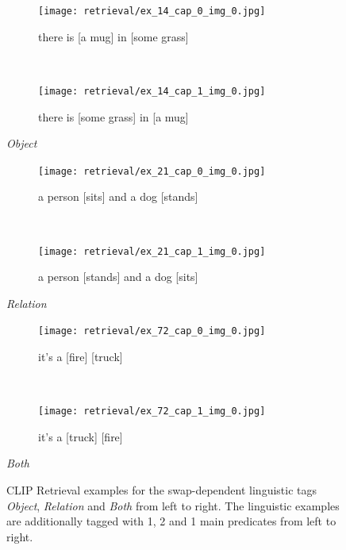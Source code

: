 \begin{figure}[ht]
\centering
    \begin{minipage}[t]{.30\textwidth}
        \begin{subfigure}[t]{\textwidth}
        \centering
        \texttt{[image: retrieval/ex\_14\_cap\_0\_img\_0.jpg]}
        \caption{there is [a mug] in [some grass]}
        \end{subfigure}\\
        \begin{subfigure}[t]{\textwidth}
        \centering
        \texttt{[image: retrieval/ex\_14\_cap\_1\_img\_0.jpg]}
        \caption{there is [some grass] in [a mug]}
        \end{subfigure}%
        \caption*{\textit{Object}}
    \end{minipage}
    \hfill
    \begin{minipage}[t]{.30\textwidth}
        \begin{subfigure}[t]{\textwidth}
        \centering
        \texttt{[image: retrieval/ex\_21\_cap\_0\_img\_0.jpg]}
        \caption{a person [sits] and a dog [stands]}
        \end{subfigure}\\
        \begin{subfigure}[t]{\textwidth}
        \centering
        \texttt{[image: retrieval/ex\_21\_cap\_1\_img\_0.jpg]}
        \caption{a person [stands] and a dog [sits]}
        \end{subfigure}%
        \caption*{\textit{Relation}}
    \end{minipage}
    \hfill
    \begin{minipage}[t]{.30\textwidth}
        \begin{subfigure}[t]{\textwidth}
        \centering
        \texttt{[image: retrieval/ex\_72\_cap\_0\_img\_0.jpg]}
        \caption{it's a [fire] [truck]}
        \end{subfigure}\\
        \begin{subfigure}[t]{\textwidth}
        \centering
        \texttt{[image: retrieval/ex\_72\_cap\_1\_img\_0.jpg]}
        \caption{it's a [truck] [fire]}
        \end{subfigure}%
        \caption*{\textit{Both}}
    \end{minipage}%
    \caption{CLIP Retrieval examples for the swap-dependent linguistic tags \textit{Object}, \textit{Relation} and \textit{Both} from left to right. The linguistic examples are additionally tagged with 1, 2 and 1 main predicates from left to right.}
    \label{fig:retrieval-examples-linguistic}
\end{figure}

